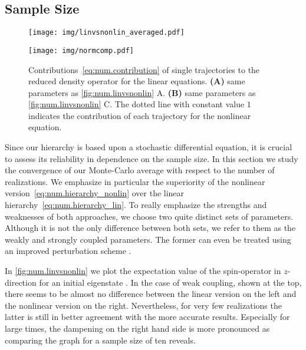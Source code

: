 \subsection{Sample Size}
\label{sub:num.spin_boson.sample_size}
%

\begin{figure}[p]
  \centering
  \texttt{[image: img/linvsnonlin\_averaged.pdf]}
  \caption{%
    $\qmean{\sigma_z}$ of the symmetric Spin-Boson model ($\epsilon = 0$) using linear(left) and nonlinear(right) stochastic hierarchy.
    \textbf{(A)} and \textbf{(C)} weakly coupled system with $g=0.18\Delta$, $\gamma=0.05\Delta$ and $\Omega=\Delta$.
    \textbf{(B)} and \textbf{(D)} strongly coupled system with $g=2\Delta$, $\gamma=0.5\Delta$ and $\Omega=2\Delta$.
    \label{fig:num.linvsnonlin}
  }
  \vspace{.5cm}
  \texttt{[image: img/normcomp.pdf]}
  \caption{%
    Contributions~\ref{eq:num.contribution} of single trajectories to the reduced density operator for the linear equations.
    \textbf{(A)} same parameters as \autoref{fig:num.linvsnonlin} A.
    \textbf{(B)} same parameters as \autoref{fig:num.linvsnonlin} C.
    The dotted line with constant value $1$ indicates the contribution of each trajectory for the nonlinear equation.
    \label{fig:num.normcomp}
  }
\end{figure}

Since our hierarchy is based upon a stochastic differential equation, it is crucial to assess its reliability in dependence on the sample size.
In this section we study the convergence of our Monte-Carlo average with respect to the number of realizations.
We emphasize in particular the superiority of the nonlinear version~\ref{eq:num.hierarchy_nonlin} over the linear hierarchy~\ref{eq:num.hierarchy_lin}.
To really emphasize the strengths and weaknesses of both approaches, we choose two quite distinct sets of parameters.
Although it is not the only difference between both sets, we refer to them as the weakly and strongly coupled parameters.
The former can even be treated using an improved perturbation scheme \cite{GaHuZh10_qubit,HuZh08_qubit}.

In \autoref{fig:num.linvsnonlin} we plot the expectation value of the spin-operator in $z$-direction for an initial eigenstate .
In the case of weak coupling, shown at the top, there seems to be almost no difference between the linear version on the left and the nonlinear version on the right.
Nevertheless, for very few realizations the latter is still in better agreement with the more accurate results.
Especially for large times, the dampening on the right hand side is more pronounced as comparing the graph for a sample size of ten reveals.

